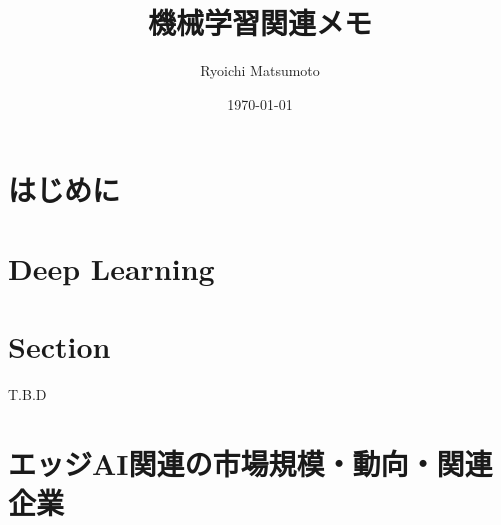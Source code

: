 \documentclass[11pt,a4paper]{jsarticle}
\title{機械学習関連メモ}
\author{Ryoichi Matsumoto}
\date{\today}
\begin{document}
\maketitle
%
%
\tableofcontents
\listoftables
\listoffigures
%
%

\section{はじめに}\label{introduction}


\section{Deep Learning}\label{deeplearning}


\section{Section}
T.B.D



\appendix

\section{エッジAI関連の市場規模・動向・関連企業}\label{appendix_market}


%
%
\end{document}
